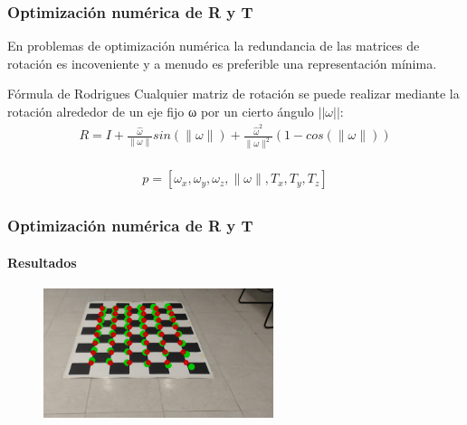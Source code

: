 \documentclass[10pt, compress]{beamer}
\begin{document}
\begin{frame}[fragile]
	\frametitle{Optimización numérica de R y T}
	En problemas de optimización numérica la redundancia de las matrices de rotación es incoveniente y a menudo es preferible una representación mínima.
	\begin{block}{Fórmula de Rodrigues}
		Cualquier matriz de rotación se puede realizar mediante la rotación
		alrededor de un eje fijo ω por un cierto ángulo $||\omega||$:
	 	\begin{eqnarray}
		 	R=I+\frac{\hat{\omega}}{\parallel\omega\parallel}sin(\parallel\omega\parallel)+ \frac{\hat{\omega}^2}{\parallel\omega\parallel^2}(1-cos(\parallel\omega\parallel))
	 	\end{eqnarray}
	\end{block}
	\begin{eqnarray}
	\begin{array}{c}
	p=[\omega_x, \omega_y, \omega_z, \parallel\omega\parallel, T_x, T_y, T_z]
	\end{array}
	\end{eqnarray}
\end{frame}

\begin{frame}[fragile]
	\frametitle{Optimización numérica de R y T}
	\framesubtitle{Resultados}
	\begin{figure}[htbp]
		\includegraphics[width=0.6\textwidth]{./pictures/conG0}
	\end{figure}	
\end{frame}
\end{document}
